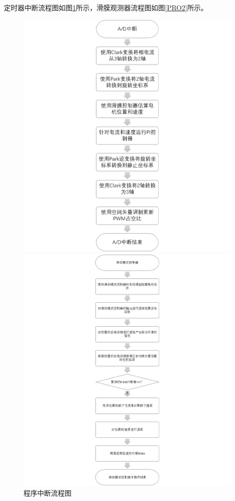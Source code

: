 ﻿\documentclass[12pt,a4paper]{article}
\begin{document}
定时器中断流程图如图\ref{PRO1}所示，滑膜观测器流程图如图\ref{PRO2}所示。
\begin{figure}[htbp]
  \centering
  \begin{minipage}{0.3\linewidth}
    \centering
    \includegraphics[width=\linewidth]{picture/程序中断流程图.png}
    \caption{程序中断流程图}
    \label{PRO1}%
  \end{minipage}
  \begin{minipage}{0.3\linewidth}
    \centering
    \includegraphics[width=\linewidth]{picture/滑膜观测器流程图.png}

\end{minipage}
\end{figure}
\end{document}
